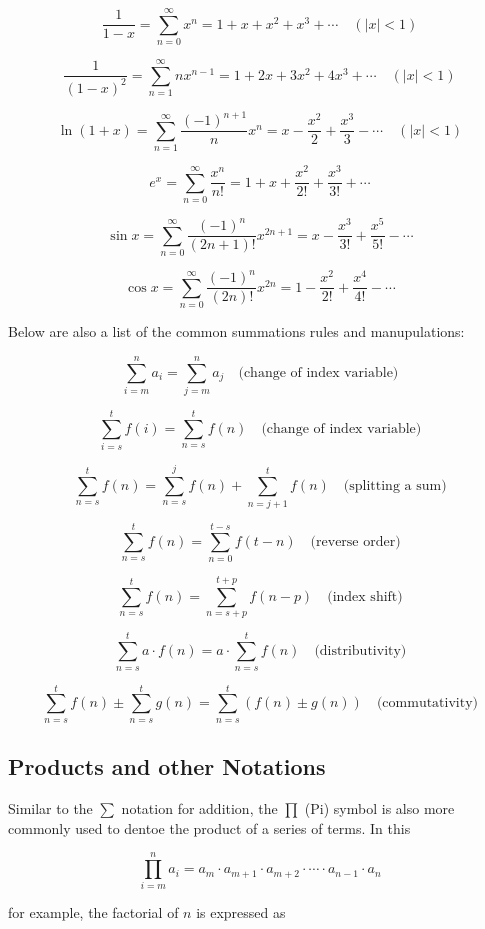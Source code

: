 \documentclass[12pt]{article}
\theoremstyle{definition}
\begin{document}
\[
\frac{1}{1 - x} = \sum_{n=0}^{\infty} x^n = 1 + x + x^2 + x^3 + \cdots \quad (\lvert x \rvert < 1)
\]

\[
\frac{1}{(1-x)^2} = \sum_{n=1}^{\infty} n x^{n-1} = 1 + 2x + 3x^2 + 4x^3 + \cdots \quad (\lvert x \rvert < 1)
\]

\[
\ln(1 + x) = \sum_{n=1}^{\infty} \frac{(-1)^{n+1}}{n} x^n = x - \frac{x^2}{2} + \frac{x^3}{3} - \cdots \quad (\lvert x \rvert < 1)
\]

\[
e^x = \sum_{n=0}^{\infty} \frac{x^n}{n!} = 1 + x + \frac{x^2}{2!} + \frac{x^3}{3!} + \cdots
\]

\[
\sin x = \sum_{n=0}^{\infty} \frac{(-1)^n}{(2n+1)!} x^{2n+1} = x - \frac{x^3}{3!} + \frac{x^5}{5!} - \cdots
\]

\[
\cos x = \sum_{n=0}^{\infty} \frac{(-1)^n}{(2n)!} x^{2n} = 1 - \frac{x^2}{2!} + \frac{x^4}{4!} - \cdots
\]

Below are also a list of the common summations rules and manupulations:

\[
\sum_{i=m}^{n} a_i = \sum_{j=m}^{n} a_j \quad \text{(change of index variable)}
\]

\[
\sum_{i=s}^{t} f(i) = \sum_{n=s}^{t} f(n) \quad \text{(change of index variable)}
\]

\[
\sum_{n=s}^{t} f(n) = \sum_{n=s}^{j} f(n) + \sum_{n=j+1}^{t} f(n) \quad \text{(splitting a sum)}
\]

\[
\sum_{n=s}^{t} f(n) = \sum_{n=0}^{t-s} f(t-n) \quad \text{(reverse order)}
\]

\[
\sum_{n=s}^{t} f(n) = \sum_{n=s+p}^{t+p} f(n-p) \quad \text{(index shift)}
\]

\[
\sum_{n=s}^{t} a \cdot f(n) = a \cdot \sum_{n=s}^{t} f(n) \quad \text{(distributivity)}
\]

\[
\sum_{n=s}^{t} f(n) \pm \sum_{n=s}^{t} g(n) = \sum_{n=s}^{t} \left(f(n) \pm g(n)\right) \quad \text{(commutativity)}
\]


\subsection{Products and other Notations}

Similar to the $\sum$ notation for addition, the $\prod$ (Pi) symbol is also more commonly used to dentoe the product of a series of terms. In this 

$$\prod_{i=m}^{n} a_i = a_m \cdot a_{m+1} \cdot a_{m+2} \cdot \cdots \cdot a_{n-1} \cdot a_n$$ 

for example, the factorial of $n$ is expressed as 
\end{document}
